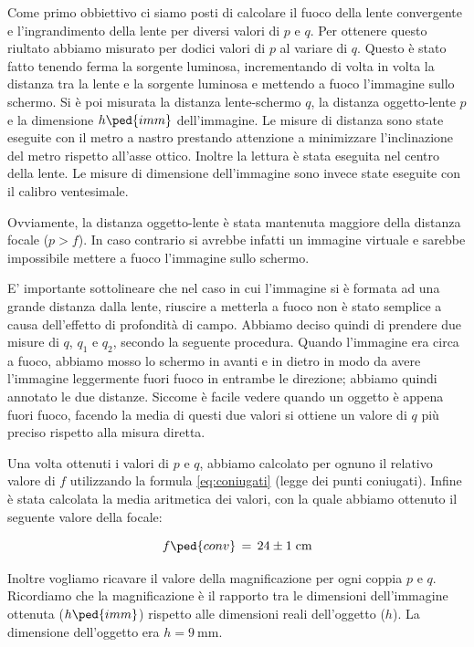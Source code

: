 Come primo obbiettivo ci siamo posti di calcolare il fuoco della lente convergente e l'ingrandimento della lente per diversi valori di $p$ e $q$. Per ottenere questo riultato abbiamo misurato per dodici valori di $p$ al variare di $q$. Questo è stato fatto tenendo ferma la sorgente luminosa, incrementando di volta in volta la distanza tra la lente e la sorgente luminosa e mettendo a fuoco l'immagine sullo schermo. Si è poi misurata la distanza lente-schermo $q$, la distanza oggetto-lente $p$ e la dimensione $h\ped{imm}$ dell'immagine. Le misure di distanza sono state eseguite con il metro a nastro prestando attenzione a minimizzare l'inclinazione del metro rispetto all'asse ottico. Inoltre la lettura è stata eseguita nel centro della lente. Le misure di dimensione dell'immagine sono invece state eseguite con il calibro ventesimale.

Ovviamente, la distanza oggetto-lente è stata mantenuta maggiore della distanza focale ($p > f$). In caso contrario si avrebbe infatti un immagine virtuale e sarebbe impossibile mettere a fuoco l'immagine sullo schermo.

E' importante sottolineare che nel caso in cui l'immagine si è formata ad una grande distanza dalla lente, riuscire a metterla a fuoco non è stato semplice a causa dell'effetto di profondità di campo. Abbiamo deciso quindi di prendere due misure di $q$, $q_1$ e $q_2$, secondo la seguente procedura. Quando l'immagine era circa a fuoco, abbiamo mosso lo schermo in avanti e in dietro in modo da avere l'immagine leggermente fuori fuoco in entrambe le direzione; abbiamo quindi annotato le due distanze. Siccome è facile vedere quando un oggetto è appena fuori fuoco, facendo la media di questi due valori si ottiene un valore di $q$ più preciso rispetto alla misura diretta.

Una volta ottenuti i valori  di $p$ e $q$, abbiamo calcolato per ognuno il relativo valore di $f$ utilizzando la formula \ref{eq:coniugati} (legge dei punti coniugati). Infine è stata calcolata la media aritmetica dei valori, con la quale abbiamo ottenuto il seguente valore della focale:

\begin{equation}
    f \ped{conv} \,=\, 24 \pm 1 \; \si{\centi\metre}
\end{equation}

Inoltre vogliamo ricavare il valore della magnificazione per ogni coppia $p$ e $q$. Ricordiamo che la magnificazione è il rapporto tra le dimensioni dell'immagine ottenuta ($h \ped{imm}$) rispetto alle dimensioni reali dell'oggetto ($h$). La dimensione dell'oggetto era $h = \SI{9}{\milli\metre}$.

